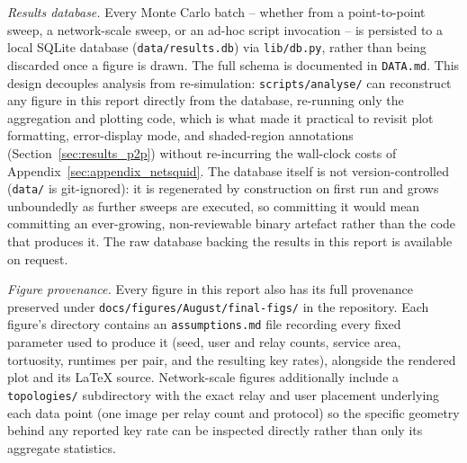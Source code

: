 \documentclass[12pt]{article}
\begin{document}
\textit{Results database.} Every Monte Carlo batch -- whether from a point-to-point sweep, a network-scale sweep, or an ad-hoc script invocation -- is persisted to a local SQLite database (\texttt{data/results.db}) via \texttt{lib/db.py}, rather than being discarded once a figure is drawn. The full schema is documented in \texttt{DATA.md}. This design decouples analysis from re-simulation: \texttt{scripts/analyse/} can reconstruct any figure in this report directly from the database, re-running only the aggregation and plotting code, which is what made it practical to revisit plot formatting, error-display mode, and shaded-region annotations (Section~\ref{sec:results_p2p}) without re-incurring the wall-clock costs of Appendix~\ref{sec:appendix_netsquid}. The database itself is not version-controlled (\texttt{data/} is git-ignored): it is regenerated by construction on first run and grows unboundedly as further sweeps are executed, so committing it would mean committing an ever-growing, non-reviewable binary artefact rather than the code that produces it. The raw database backing the results in this report is available on request.

\textit{Figure provenance.} Every figure in this report also has its full provenance preserved under \texttt{docs/figures/August/final-figs/} in the repository. Each figure's directory contains an \texttt{assumptions.md} file recording every fixed parameter used to produce it (seed, user and relay counts, service area, tortuosity, runtimes per pair, and the resulting key rates), alongside the rendered plot and its \LaTeX{} source. Network-scale figures additionally include a \texttt{topologies/} subdirectory with the exact relay and user placement underlying each data point (one image per relay count and protocol) so the specific geometry behind any reported key rate can be inspected directly rather than only its aggregate statistics.



\end{document}
